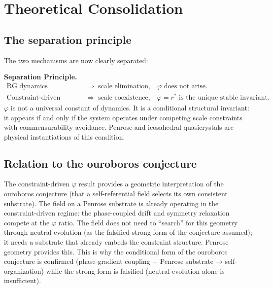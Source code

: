 \documentclass[11pt,a4paper]{article}
\theoremstyle{plain}
\theoremstyle{definition}
\newcommand{\phiGolden}{\varphi}
\begin{document}
\section{Theoretical Consolidation}
\label{sec:theory}

\subsection{The separation principle}

The two mechanisms are now clearly separated:

\begin{keybox}
\textbf{Separation Principle.}
\begin{align*}
\text{RG dynamics} \;&\Rightarrow\; \text{scale elimination,}
  \quad \phiGolden \text{ does not arise.} \\
\text{Constraint-driven dynamics} \;&\Rightarrow\;
  \text{scale coexistence,} \quad
  \phiGolden = r^* \text{ is the unique stable invariant.}
\end{align*}
$\phiGolden$ is not a universal constant of dynamics. It is a conditional
structural invariant: it appears if and only if the system operates under
competing scale constraints with commensurability avoidance. Penrose and
icosahedral quasicrystals are physical instantiations of this condition.
\end{keybox}

\subsection{Relation to the ouroboros conjecture}

The constraint-driven $\phiGolden$ result provides a geometric
interpretation of the ouroboros conjecture (that a self-referential
field selects its own consistent substrate). The field on a Penrose
substrate is already operating in the constraint-driven regime: the
phase-coupled drift and symmetry relaxation compete at the
$\phiGolden$ ratio. The field does not need to ``search'' for this
geometry through neutral evolution (as the falsified strong form of
the conjecture assumed); it needs a substrate that already embeds the
constraint structure. Penrose geometry provides this. This is why the
conditional form of the ouroboros conjecture is confirmed
(phase-gradient coupling + Penrose substrate → self-organization)
while the strong form is falsified (neutral evolution alone is
insufficient).
\end{document}
